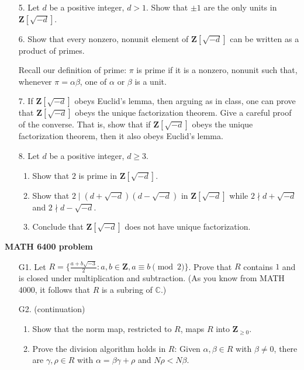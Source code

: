 \documentclass[12pt]{article}
\def\Z{\mathbf{Z}}
\begin{document}
\begin{enumerate}
\item[5.] Let $d$ be a positive integer, $d>1$. Show that $\pm 1$ are the only units in $\Z[\sqrt{-d}]$.

\item[6.] Show that every  nonzero, nonunit element of $\Z[\sqrt{-d}]$ can be written as a product of primes. 

{\scriptsize Recall our definition of \textsf{prime}: $\pi$ is prime if it is a nonzero, nonunit such that, whenever $\pi=\alpha \beta$, one of $\alpha$ or $\beta$ is a unit.}

\item[7.] If $\Z[\sqrt{-d}]$ obeys Euclid's lemma, then arguing as in class, one can prove that $\Z[\sqrt{-d}]$ obeys the unique factorization theorem. Give a careful proof of the converse. That is, show that if $\Z[\sqrt{-d}]$ obeys the unique factorization theorem, then it also obeys Euclid's lemma.

\item[8.] Let $d$ be a positive integer, $d\ge 3$.
\begin{enumerate}
\item Show that $2$ is prime in $\Z[\sqrt{-d}]$.
\item Show that $2\mid (d+\sqrt{-d})(d-\sqrt{-d})$ in $\Z[\sqrt{-d}]$ while $2\nmid d+\sqrt{-d}$ and $2\nmid d-\sqrt{-d}$.
\item Conclude that $\Z[\sqrt{-d}]$ does not have unique factorization.
\end{enumerate}


\end{enumerate}

\vskip 10pt \noindent\textbf{MATH 6400 problem}
\begin{enumerate}
\item[G1.] Let $R = \{\frac{a+b\sqrt{-3}}{2}: a, b \in \Z, a\equiv b\pmod{2}\}$. Prove that $R$ contains $1$ and is closed under multiplication and subtraction. (As you know from MATH 4000, it follows that $R$ is a subring of $\mathbb{C}$.)


\item[G2.] (continuation) 
\begin{enumerate}
    \item Show that the norm map, restricted to $R$, maps $R$ into $\Z_{\ge 0}$.
    \item Prove the division algorithm holds in $R$: Given $\alpha, \beta \in R$ with $\beta \ne 0$, there are $\gamma, \rho \in R$ with $\alpha=\beta\gamma + \rho$ and $N\rho < N\beta$.
\end{enumerate}
\end{enumerate}
\end{document}
